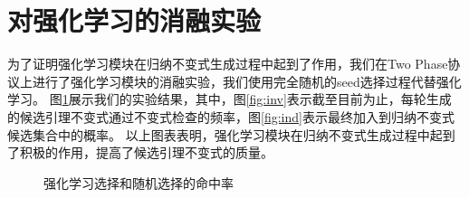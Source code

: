 \section{对强化学习的消融实验}
为了证明强化学习模块在归纳不变式生成过程中起到了作用，我们在Two Phase协议上进行了强化学习模块的消融实验，我们使用完全随机的seed选择过程代替强化学习。
图\ref{fig:all}展示我们的实验结果，其中，图\ref{fig:inv}表示截至目前为止，每轮生成的候选引理不变式通过不变式检查的频率，图\ref{fig:ind}表示最终加入到归纳不变式候选集合中的概率。
以上图表表明，强化学习模块在归纳不变式生成过程中起到了积极的作用，提高了候选引理不变式的质量。
\begin{figure}[htb]
    \centering
    \hfill
    \hfill
    \caption{强化学习选择和随机选择的命中率}
    \label{fig:all}
\end{figure}
